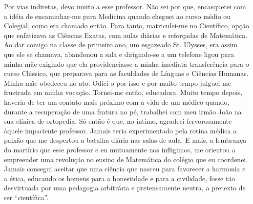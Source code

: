 Por vias indiretas, devo muito a esse professor. 
Não sei por que, encasquetei com a idéia de encaminhar-me para Medicina quando cheguei ao curso médio ou Colegial, como era chamado então. 
Para tanto, matriculei-me no Científico, opção que enfatizava as Ciências Exatas, com aulas diárias e reforçadas de Matemática. 
Ao dar comigo na classe de primeiro ano, um esgazeado Sr. Ulysses, era assim que ele se chamava, abandonou a sala e dirigindo-se a um telefone ligou para minha mãe exigindo que ela providenciasse a minha imediata transferência para o curso Clássico, que preparava para as faculdades de Línguas e Ciências Humanas. 
Minha mãe obedeceu no ato. Odiei-o por isso e por muito tempo julguei-me frustrada em minha vocação. 
Tornei-me então, educadora. 
Muito tempo depois, haveria de ter um contato mais próximo com a vida de um médico quando, durante a recuperação de uma fratura no pé, trabalhei com meu irmão João na sua clínica de ortopedia. 
Só então é que, no íntimo, agradeci fervorosamente àquele impaciente professor. Jamais teria experimentado pela rotina médica a paixão que me despertou a batalha diária nas salas de aula. 
E mais, a lembrança do martírio que esse professor e eu mutuamente nos infligimos, me orientou a empreender uma revolução no ensino de Matemática do colégio que eu coordenei. 
Jamais consegui aceitar que uma ciência que nasceu para favorecer a harmonia e a ética, educando os homens para a honestidade e para a civilidade, fosse tão desvirtuada por uma pedagogia arbitrária e pretensamente neutra, a pretexto de ser ``científica''. 

